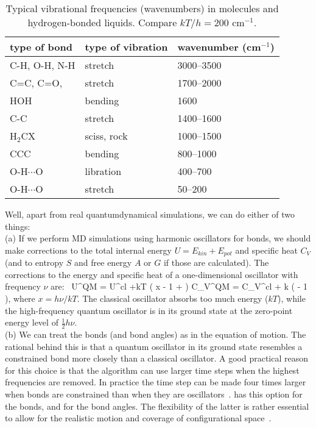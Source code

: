 \begin{table}
\begin{center} 
\begin{tabular}{|l|l|l|}
\hline
type of bond & type of vibration & wavenumber  (cm$^{-1}$) \\ \hline
C-H, O-H, N-H   &  stretch   &  3000--3500 \\
C=C, C=O,       &  stretch   & 1700--2000 \\
HOH             &  bending   &  1600 \\
C-C             &  stretch   & 1400--1600 \\
H$_2$CX         & sciss, rock & 1000--1500 \\ 
CCC             &  bending   & 800--1000 \\
O-H$\cdots$O    &  libration & 400--700 \\
O-H$\cdots$O    &  stretch   &  50--200 \\
\hline
\end{tabular} 
\end{center} 
\caption{Typical vibrational frequencies (wavenumbers) in molecules and hydrogen-bonded liquids. Compare $kT/h = 200$ cm$^{-1}$.}
\label{tab:vibrations}
\end{table}

Well, apart from real quantumdynamical simulations, we can do either
of two things: \\ (a) If we perform MD simulations using harmonic
oscillators for bonds, we should make corrections to the total
internal energy $U = E_{kin} + E_{pot}$ and specific heat $C_V$ (and
to entropy $S$ and free energy $A$ or $G$ if those are
calculated). The corrections to the energy and specific heat of a
one-dimensional oscillator with frequency $\nu$
are:~\cite{McQuarrie76}
\beq
 U^{QM} = U^{cl} +kT \left( \half x - 1 +  \right)
\eeq
\beq
 C_V^{QM} = C_V^{cl} + k \left(  - 1 \right), 
\eeq
where $x=h\nu /kT$. The classical oscillator absorbs too much energy
($kT$), while the high-frequency quantum oscillator is in its ground
state at the zero-point energy level of $\frac{1}{2} h\nu$. \\ 
(b) We can treat the bonds (and bond angles) as {\em {}} in
the equation of motion. The rational behind this is that a quantum
oscillator in its ground state resembles a constrained bond more
closely than a classical oscillator. A good practical reason for this
choice is that the algorithm can use larger time steps when the
highest frequencies are removed. In practice the time step can be made
four times larger when bonds are constrained than when they are
oscillators~\cite{Gunsteren77}. {\gromacs} has this option for the
bonds, and for the bond angles.  The flexibility of the latter is
rather essential to allow for the realistic motion and coverage of
configurational space~\cite{Gunsteren77}.    
 
